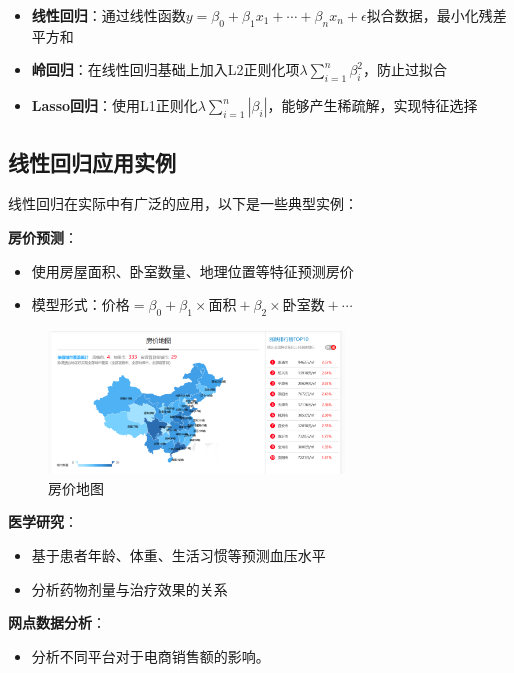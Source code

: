 \begin{itemize}
    \item \textbf{线性回归}：通过线性函数$y = \beta_0 + \beta_1x_1 + \cdots + \beta_nx_n + \epsilon$拟合数据，最小化残差平方和
    \item \textbf{岭回归}：在线性回归基础上加入L2正则化项$\lambda\sum_{i=1}^n\beta_i^2$，防止过拟合
    \item \textbf{Lasso回归}：使用L1正则化$\lambda\sum_{i=1}^n|\beta_i|$，能够产生稀疏解，实现特征选择
\end{itemize}

\subsection{线性回归应用实例}

线性回归在实际中有广泛的应用，以下是一些典型实例：

\textbf{房价预测}：
\begin{itemize}
    \item 使用房屋面积、卧室数量、地理位置等特征预测房价
    \item 模型形式：$\text{价格} = \beta_0 + \beta_1\times\text{面积} + \beta_2\times\text{卧室数} + \cdots$
\end{itemize}
\begin{figure}[!htb]
	\centering
	\includegraphics[width=0.70\textwidth]{./figures/house.png}
	\caption{房价地图}
\end{figure}

\textbf{医学研究}：
\begin{itemize}
    \item 基于患者年龄、体重、生活习惯等预测血压水平
    \item 分析药物剂量与治疗效果的关系
\end{itemize}

\textbf{网点数据分析}：
\begin{itemize}
    \item 分析不同平台对于电商销售额的影响。
\end{itemize}



